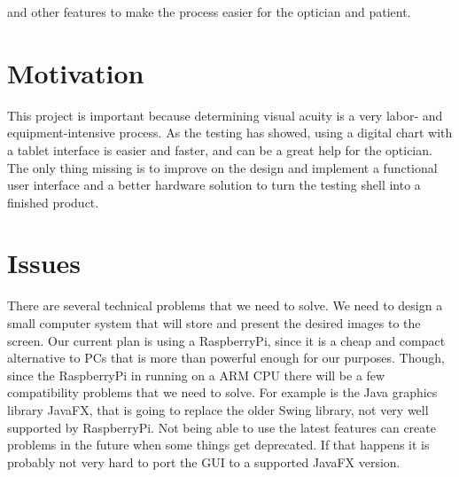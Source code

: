 \documentclass[12pt,a4paper,notitlepage]{report}
\begin{document}
and other features to make the process easier for the optician and patient.




\section{Motivation}

This project is important because determining visual acuity is a very labor- and equipment-intensive process. As the testing has showed, using a digital chart with a tablet interface is easier and faster, and can be a great help for the optician. The only thing missing is to improve on the design and implement a functional user interface and a better hardware solution to turn the testing shell into a finished product. 






\section{Issues}

There are several technical problems that we need to solve. We need to design a small computer system that will store and present the desired images to the screen. Our current plan is using a RaspberryPi, since it is a cheap and compact alternative to PCs that is more than powerful enough for our purposes. Though, since the RaspberryPi in running on a ARM CPU there will be a few compatibility problems that we need to solve. For example is the Java graphics library JavaFX, that is going to replace the older Swing library, not very well supported by RaspberryPi. Not being able to use the latest features can create problems in the future when some things get deprecated. If that happens it is probably not very hard to port the GUI to a supported JavaFX version.
\end{document}
